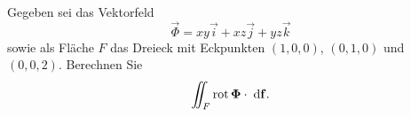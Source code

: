\begin{atiTask}[
  title = Oberflächenintegral
]

Gegeben sei das Vektorfeld 
\[
\vec{\Phi}=xy\vec{i}+xz\vec{j}+yz\vec{k}
\]
sowie als Fläche $F$ das Dreieck mit Eckpunkten $(1,0,0)$, $(0,1,0)$ und $(0,0,2)$. Berechnen Sie 
\[
\iint_F \operatorname{rot} \mathbf{\Phi}\cdot \;\mathrm{d}\mathbf{f}.
\]


\end{atiTask}
